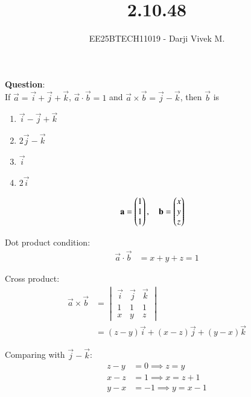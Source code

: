 \documentclass[journal]{IEEEtran}
\begin{document}


\title{2.10.48}
\author{EE25BTECH11019 - Darji Vivek M.}
{\let\newpage\relax\maketitle}

\renewcommand{\thefigure}{\theenumi}
\renewcommand{\thetable}{\theenumi}
\setlength{\intextsep}{10pt}
\renewcommand{\thetable}{\theenumi}

\textbf{Question}:\\
If $\vec{a} = \vec{i}+\vec{j}+\vec{k}$, $\vec{a}\cdot\vec{b}=1$ and $\vec{a}\times\vec{b}=\vec{j}-\vec{k}$, then $\vec{b}$ is  

\begin{multicols}{2}
\begin{enumerate}[label=(\alph*)]
\item $\vec{i}-\vec{j}+\vec{k}$  
\item $2\vec{j}-\vec{k}$  
\item $\vec{i}$  
\item $2\vec{i}$  
\end{enumerate}
\end{multicols}

\solution  

\begin{align}
\mathbf{a} &= \begin{pmatrix}1\\1\\1\end{pmatrix}, \quad 
\mathbf{b} = \begin{pmatrix}x\\y\\z\end{pmatrix}
\end{align}

Dot product condition:
\begin{align}
\vec{a}\cdot\vec{b} &= x+y+z = 1
\end{align}

Cross product:
\begin{align}
\vec{a}\times \vec{b} &= 
\begin{vmatrix}
\vec{i} & \vec{j} & \vec{k} \\
1 & 1 & 1 \\
x & y & z
\end{vmatrix} \\
&= (z-y)\vec{i}+(x-z)\vec{j}+(y-x)\vec{k}
\end{align}

Comparing with $\vec{j}-\vec{k}$:
\begin{align}
z-y &= 0 \implies z=y \\
x-z &= 1 \implies x=z+1 \\
y-x &= -1 \implies y=x-1
\end{align}
\end{document}
